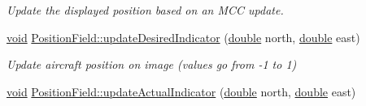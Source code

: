 \begin{DoxyCompactItemize}
\begin{DoxyCompactList}\small\item\em Update the displayed position based on an M\-C\-C update. \end{DoxyCompactList}\item 
\hyperlink{group___u_a_v_objects_plugin_ga444cf2ff3f0ecbe028adce838d373f5c}{void} \hyperlink{group___g_c_s_control_gadget_plugin_gaf3402b55a7601e5b8b3346b40b0f0df7}{Position\-Field\-::update\-Desired\-Indicator} (\hyperlink{_super_l_u_support_8h_a8956b2b9f49bf918deed98379d159ca7}{double} north, \hyperlink{_super_l_u_support_8h_a8956b2b9f49bf918deed98379d159ca7}{double} east)
\begin{DoxyCompactList}\small\item\em Update aircraft position on image (values go from -\/1 to 1) \end{DoxyCompactList}\item 
\hyperlink{group___u_a_v_objects_plugin_ga444cf2ff3f0ecbe028adce838d373f5c}{void} \hyperlink{group___g_c_s_control_gadget_plugin_ga1945f29d366d975855609e7a8e8a1338}{Position\-Field\-::update\-Actual\-Indicator} (\hyperlink{_super_l_u_support_8h_a8956b2b9f49bf918deed98379d159ca7}{double} north, \hyperlink{_super_l_u_support_8h_a8956b2b9f49bf918deed98379d159ca7}{double} east)
\end{DoxyCompactItemize}
